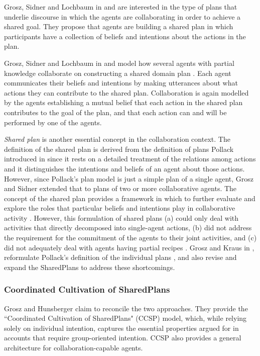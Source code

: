 \documentclass[11pt]{article}
\begin{document}
Grosz, Sidner and Lochbaum in \cite{grosz:plans-discourse} and
\cite{lochbaum:plan-models} are interested in the type of plans that underlie
discourse in which the agents are collaborating in order to achieve a shared
goal. They propose that agents are building a shared plan in which participants
have a collection of beliefs and intentions about the actions in the plan.

Grosz, Sidner and Lochbaum in \cite{grosz:plans-discourse} and
\cite{lochbaum:plan-models} model how several agents with partial knowledge
collaborate on constructing a shared domain plan . Each agent communicates their
beliefs and intentions by making utterances about what actions they can
contribute to the shared plan. Collaboration is again modelled by the agents
establishing a mutual belief that each action in the shared plan contributes to
the goal of the plan, and that each action can and will be performed by one of
the agents.

\textit{Shared plan} is another essential concept in the collaboration context.
The definition of the shared plan is derived from the definition of plans
Pollack introduced in \cite{pollack:plan-inference,
pollack:plan-mental-attitudes} since it rests on a detailed treatment of the
relations among actions and it distinguishes the intentions and beliefs of an
agent about those actions. However, since Pollack's plan model is just a simple
plan of a single agent, Grosz and Sidner extended that to plans of two or more
collaborative agents. The concept of the shared plan provides a framework in
which to further evaluate and explore the roles that particular beliefs and
intentions play in collaborative activity \cite{lochbaum:plan-models}. However,
this formulation of shared plans (a) could only deal with activities that
directly decomposed into single-agent actions, (b) did not address the
requirement for the commitment of the agents to their joint activities, and (c)
did not adequately deal with agents having partial recipes
\cite{grosz:collaboration}. Grosz and Kraus in \cite{grosz:collaboration},
reformulate Pollack's definition of the individual plans
\cite{pollack:plan-mental-attitudes}, and also revise and expand the SharedPlans
to address these shortcomings.

\subsubsection{Coordinated Cultivation of SharedPlans}

Grosz and Hunsberger \cite{grosz:ccsp} claim to reconcile the two approaches.
They provide the ``Coordinated Cultivation of SharedPlans" (CCSP) model, which,
while relying solely on individual intention, captures the essential properties
argued for in accounts that require group-oriented intention. CCSP also provides
a general architecture for collaboration-capable agents.
\end{document}
